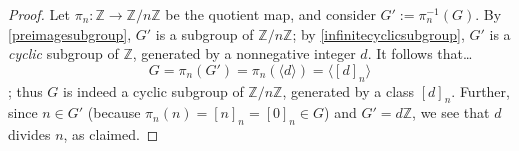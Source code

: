 \begin{proof}
Let $\pi_n : \mathbb{Z} \rightarrow \mathbb{Z}/n\mathbb{Z}$ be the quotient map, and consider $G' := \pi_n^{-1}(G).$
By \ref{preimagesubgroup}, $G'$ is a subgroup of $\mathbb{Z}/n\mathbb{Z}$; by \ref{infinitecyclicsubgroup}, $G'$ is a
\emph{cyclic} subgroup of $\mathbb{Z}$, generated by a nonnegative integer $d$. It follows that\dots
$$G = \pi_n(G') = \pi_n(\langle d \rangle) = \langle [d]_n \rangle$$;
thus $G$ is indeed a cyclic subgroup of $\mathbb{Z}/n\mathbb{Z}$, generated by a class $[d]_n$. Further, since
$n \in G'$ (because $\pi_n(n) = [n]_n = [0]_n \in G$) and $G' = d\mathbb{Z}$, we see that $d$ divides $n$, as
claimed.
\end{proof}
